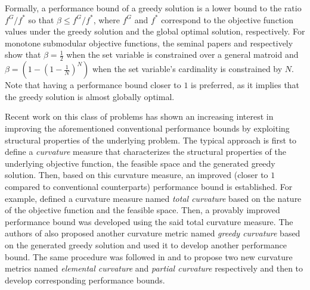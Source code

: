 \documentclass[conference]{IEEEtran}
\begin{document}

Formally, a performance bound of a greedy solution is a lower bound to the ratio $f^G/f^*$ so that $\beta \leq f^{G}/f^{\ast}$, where $f^{G}$ and $f^{\ast}$ correspond to the objective function values under the greedy solution and the global optimal solution, respectively. For monotone submodular objective functions, the seminal papers \cite{Fisher1978} and \cite{Nemhauser1978} respectively show that $\beta = \frac{1}{2}$ when the set variable is constrained over a general matroid and $\beta = (1-(1-\frac{1}{N})^N)$  when the set variable's cardinality is constrained by $N$. Note that having a performance bound closer to $1$ is preferred, as it implies that the greedy solution is almost globally optimal.

Recent work on this class of problems has shown an increasing interest in improving the aforementioned conventional performance bounds by exploiting structural properties of the underlying problem. The typical approach is first to define a \emph{curvature} measure that characterizes the structural properties of the underlying objective function, the feasible space and the generated greedy solution. Then, based on this curvature measure, an improved (closer to $1$ compared to conventional counterparts) performance bound is established. For example, \cite{Conforti1984} defined a curvature measure named \emph{total curvature} based on the nature of the objective function and the feasible space. Then, a provably improved performance bound was  developed using the said total curvature measure. The authors of \cite{Conforti1984} also proposed another curvature metric named \emph{greedy curvature} based on the generated greedy solution and used it to develop another performance bound. The same procedure was followed in \cite{Wang2016} and \cite{Liu2018} to propose two new curvature metrics named \emph{elemental curvature} and \emph{partial curvature} respectively and then to develop corresponding performance bounds. 
\end{document}
